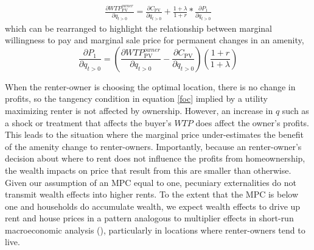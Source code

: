 \documentclass[ecta,nameyear,draft]{econsocart}
\theoremstyle{plain}
\theoremstyle{remark}
\begin{document}
\begin{eqnarray*}
	\frac{\partial \mathit{WTP}^{\mathit{owner}}_{\mathrm{PV}}}{\partial q_{t>0}} =	\frac{\partial C_{\mathrm{PV}}}{\partial q_{t>0}}+\frac{1+\lambda}{1+r}*\frac{\partial P_1}{\partial q_{t>0}}
\end{eqnarray*}
which can be rearranged to highlight the relationship between marginal willingness to pay and marginal sale price for permanent changes in an amenity,
\begin{equation*}
	\frac{\partial P_1} {\partial q_{t>0}}=\left(
	\frac{\partial \mathit{WTP}^{\mathit{owner}}_{\mathrm{PV}}}{\partial q_{t>0}}-\frac{\partial C_{\mathrm{PV}}}{\partial q_{t>0}}\right)\left(\frac{1+r}{1+\lambda}\right)
\end{equation*}


When the renter-owner is choosing the optimal location, there is no change in profits, so the tangency condition in equation \ref{foc} implied by a utility maximizing renter is not affected by ownership. However, an increase in $q$ such as a shock or treatment that affects the buyer's $WTP$ does affect the owner's profits. This leads to the situation where the marginal price under-estimates the benefit of the amenity change to renter-owners. Importantly, because an renter-owner's decision about where to rent does not influence the profits from homeownership, the wealth impacts on price that result from this are smaller than otherwise. Given our assumption of an MPC equal to one, pecuniary externalities do not transmit wealth effects into higher rents. To the extent that the MPC is below one and households do accumulate wealth, we expect wealth effects to drive up rent and house prices in a pattern analogous to multiplier effects in short-run macroeconomic analysis (\cite{samuelson39}), particularly in locations where renter-owners tend to live.
\end{document}

